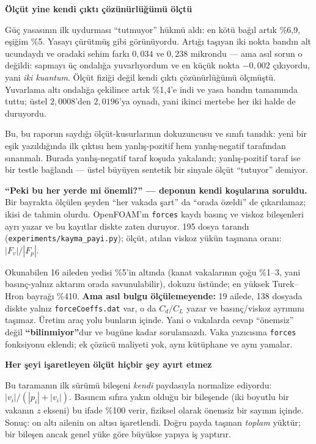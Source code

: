 \documentclass[11pt,a4paper]{article}
\newcommand{\kkkenar}{lacivert}
\newcommand{\kkzemin}{kod}
\newenvironment{renkkutu}[3]{%
  \renewcommand{\kkkenar}{#1}\renewcommand{\kkzemin}{#2}%
  \par\medskip\noindent
  \begin{lrbox}{\kutugovde}%
  \begin{minipage}{\dimexpr\linewidth-2\fboxsep-2\fboxrule\relax}\footnotesize
  \textcolor{#1}{\textbf{#3}}\par\vspace{3pt}%
}{%
  \end{minipage}%
  \end{lrbox}%
  \noindent\fcolorbox{\kkkenar}{\kkzemin}{\usebox{\kutugovde}}%
  \par\medskip
}
\newenvironment{dikkat}[1]{\begin{renkkutu}{orta}{ortabg}{#1}}{\end{renkkutu}}
\begin{document}
\begin{description}
        \begin{dikkat}{Ölçüt yine kendi çıktı çözünürlüğümü ölçtü}
        Güç yasasının ilk uydurması ``tutmuyor'' hükmü aldı: en kötü bağıl
        artık \%6{,}9, eşiğim \%5. Yasayı çürütmüş gibi görünüyordu. Artığı
        taşıyan iki nokta bandın alt ucundaydı ve oradaki sehim farkı
        $0{,}034$ ve $0{,}238$ mikrondu --- ama asıl sorun o değildi:
        sapmayı üç ondalığa yuvarlıyordum ve en küçük nokta $-0{,}002$
        çıkıyordu, yani \emph{iki kuantum}. Ölçüt fiziği değil kendi çıktı
        çözünürlüğümü ölçmüştü. Yuvarlama altı ondalığa çekilince artık
        \%1{,}4'e indi ve yasa bandın tamamında tuttu; üstel $2{,}0008$'den
        $2{,}0196$'ya oynadı, yani ikinci mertebe her iki halde de
        duruyordu.

        Bu, bu raporun saydığı ölçüt-kusurlarının dokuzuncusu ve sınıfı
        tanıdık: yeni bir eşik yazıldığında ilk çıktısı hem yanlış-pozitif
        hem yanlış-negatif tarafından sınanmalı. Burada yanlış-negatif
        taraf koşuda yakalandı; yanlış-pozitif taraf ise bir testle
        bağlandı --- üstel büyüyen sentetik bir sinyale ölçüt ``tutuyor''
        demiyor.
        \end{dikkat}

        \medskip
        \noindent \textbf{``Peki bu her yerde mi önemli?'' --- deponun kendi
        koşularına soruldu.} Bir bayrakta ölçülen şeyden ``her vakada şart''
        da ``orada özeldi'' de çıkarılamaz; ikisi de tahmin olurdu. OpenFOAM'ın
        \texttt{forces} kaydı basınç ve viskoz bileşenleri ayrı yazar ve bu
        kayıtlar diskte zaten duruyor. 195 dosya tarandı
        (\texttt{experiments/kayma\_payi.py}); ölçüt, atılan viskoz yükün
        taşınana oranı: $|F_v|/|F_p|$.

        \noindent Okunabilen 16 aileden yedisi \%5'in altında (kanat
        vakalarının çoğu \%1--3, yani basınç-yalnız aktarım orada
        savunulabilir), dokuzu üstünde; en yüksek Turek--Hron bayrağı
        \%410. \textbf{Ama asıl bulgu ölçülemeyende:} 19 ailede, 138 dosyada
        diskte yalnız \texttt{forceCoeffs.dat} var, o da $C_d/C_L$ yazar ve
        basınç/viskoz ayrımını taşımaz. Üretim araç yolu bunların içinde.
        Yani o vakalarda cevap ``önemsiz'' değil \textbf{``bilinmiyor''}dur ve
        bugüne kadar sorulamazdı. Vaka yazıcısına \texttt{forces} fonksiyonu
        eklendi; ek çözücü maliyeti yok, aynı kütüphane ve aynı yamalar.

        \begin{dikkat}{Her şeyi işaretleyen ölçüt hiçbir şey ayırt etmez}
        Bu taramanın ilk sürümü bileşeni \emph{kendi} paydasıyla normalize
        ediyordu: $|v_i|/(|p_i|+|v_i|)$. Basıncın sıfıra yakın olduğu bir
        bileşende (iki boyutlu bir vakanın $z$ ekseni) bu ifade \%100 verir,
        fiziksel olarak önemsiz bir sayının içinde. Sonuç: on altı ailenin on
        altısı işaretlendi. Doğru payda taşınan \emph{toplam} yüktür; bir
        bileşen ancak genel yüke göre büyükse yapıya iş yaptırır.


\end{dikkat}
\end{description}
\end{document}

